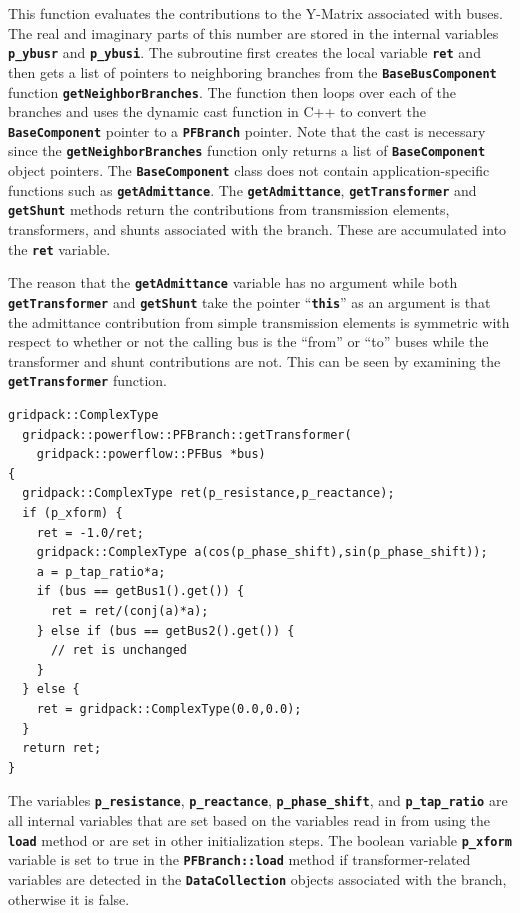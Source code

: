 \documentclass[12pt]{report} %
\begin{document}
This function evaluates the contributions to the Y-Matrix associated with buses. The real and imaginary parts of this number are stored in the internal variables \texttt{\textbf{p\_ybusr}} and \texttt{\textbf{p\_ybusi}}. The subroutine first creates the local variable \texttt{\textbf{ret}} and then gets a list of pointers to neighboring branches from the \texttt{\textbf{BaseBusComponent}} function \texttt{\textbf{getNeighborBranches}}. The function then loops over each of the branches and uses the dynamic cast function in C++ to convert the \texttt{\textbf{BaseComponent}} pointer to a \texttt{\textbf{PFBranch}} pointer. Note that the cast is necessary since the \texttt{\textbf{getNeighborBranches}} function only returns a list of \texttt{\textbf{BaseComponent}} object pointers. The \texttt{\textbf{BaseComponent}} class does not contain application-specific functions such as \texttt{\textbf{getAdmittance}}. The \texttt{\textbf{getAdmittance}}, \texttt{\textbf{getTransformer}} and \texttt{\textbf{getShunt}} methods return the contributions from transmission elements, transformers, and shunts associated with the branch. These are accumulated into the \texttt{\textbf{ret}} variable.

The reason that the \texttt{\textbf{getAdmittance}} variable has no argument while both \texttt{\textbf{getTransformer}} and \texttt{\textbf{getShunt}} take the pointer ``\texttt{\textbf{this}}'' as an argument is that the admittance contribution from simple transmission elements is symmetric with respect to whether or not the calling bus is the ``from'' or ``to'' buses while the transformer and shunt contributions are not. This can be seen by examining the \texttt{\textbf{getTransformer}} function.

{
\color{red}
\begin{Verbatim}[fontseries=b]
gridpack::ComplexType
  gridpack::powerflow::PFBranch::getTransformer(
    gridpack::powerflow::PFBus *bus)
{
  gridpack::ComplexType ret(p_resistance,p_reactance);
  if (p_xform) {
    ret = -1.0/ret;
    gridpack::ComplexType a(cos(p_phase_shift),sin(p_phase_shift));
    a = p_tap_ratio*a;
    if (bus == getBus1().get()) {
      ret = ret/(conj(a)*a);
    } else if (bus == getBus2().get()) {
      // ret is unchanged
    }
  } else {
    ret = gridpack::ComplexType(0.0,0.0);
  }
  return ret;
}
\end{Verbatim}
}

The variables \texttt{\textbf{p\_resistance}}, \texttt{\textbf{p\_reactance}}, \texttt{\textbf{p\_phase\_shift}}, and \texttt{\textbf{p\_tap\_ratio}} are all internal variables that are set based on the variables read in from using the \texttt{\textbf{load}} method or are set in other initialization steps. The boolean variable \texttt{\textbf{p\_xform}} variable is set to true in the \texttt{\textbf{PFBranch::load}} method if transformer-related variables are detected in the \texttt{\textbf{DataCollection}} objects associated with the branch, otherwise it is false.
\end{document}
